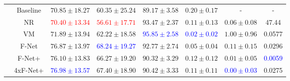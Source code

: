 \begin{table}[h]
{\begin{tabular}{c c c c c c c c}
		\midrule		
		\multirow{6}{*}{\rotatebox{90}{$R=10$}} & Baseline & $70.85 \pm 18.27$ & $60.35 \pm 25.24$ & $89.17 \pm 3.58$ & $0.20 \pm 0.17$ & - & -\\ 
		 & NR & \textcolor{red}{$70.40 \pm 13.34$} & \textcolor{red}{$56.61 \pm 17.71$} & $93.47 \pm 2.37$ & $0.11 \pm 0.13$ & $0.06 \pm 0.08$ & 47.44 \\
		 & VM & $71.89 \pm 13.94$ & $62.22 \pm 18.58$ & \textcolor{blue}{$95.85 \pm 2.58$} & \textcolor{blue}{$0.02 \pm 0.02$} & $1.00 \pm 0.96$ & 0.0577\\	 %
		 & F-Net & $76.87 \pm 13.97$ & \textcolor{blue}{$68.24 \pm 19.27$} & $92.77 \pm 2.74$ & $0.05 \pm 0.04$ & $0.11 \pm 0.15$ & 0.0296\\ 
		 & F-Net+ & $76.10 \pm 13.83$ & $66.27 \pm 19.20$ & $90.32 \pm 3.29$ & $0.12 \pm 0.12$ & $0.01 \pm 0.05$ & \textcolor{blue}{0.0059}\\ 
		 & 4xF-Net+ & \textcolor{blue}{$76.98 \pm 13.57$} & $67.40 \pm 18.90$ & $90.42 \pm 3.33$ & $0.11 \pm 0.11$ & \textcolor{blue}{$0.00 \pm 0.03$} & 0.0275\\ 
		 \bottomrule
	\end{tabular}}
\end{table}


